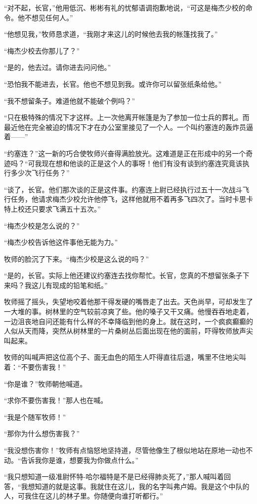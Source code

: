     “对不起，长官，”他用低沉、彬彬有礼的忧郁语调抱歉地说，“可这是梅杰少校的命令。他不想见任何人。”

    “他想见我，”牧师恳求道，“我刚才来这儿的时候他去我的帐篷找我了。”

    “梅杰少校去你那儿了？”

    “是的，他去过。请你进去问问他。”

    “恐怕我不能进去，长官。他也不想见到我。或许你可以留张纸条给他。”

    “我不想留条子。难道他就不能破个例吗？”

    “只在极特殊的情况下才这样。上一次他离开帐篷是为了参加一位士兵的葬礼。而最近他在完全被迫的情况下才在办公室里接见了一个人。一个叫约塞连的轰炸员逼着——”

    “约塞连？”这一新的巧合使牧师兴奋得满脸放光。这难道是正在形成中的另一个奇迹吗？“可我现在想和他谈的正是这个人的事呀！他们有没有谈到约塞连究竟该执行多少次飞行任务？”

    “谈了，长官。他们那次谈的正是这件事。约塞连上尉已经执行过五十一次战斗飞行任务，他请求梅杰少校允许他停飞，这样他就用不着再多飞四次了。当时卡思卡特上校还只要求飞满五十五次。”

    “梅杰少校是怎么说的？”

    “梅杰少校告诉他这件事他无能为力。”

    牧师的脸沉了下来。“梅杰少校是这么说的吗？”

    “是的，长官。实际上他还建议约塞连去找你帮忙。长官，您真的不想留张条子下来吗？我这儿有现成的铅笔和纸。”

    牧师摇了摇头，失望地咬着他那干得发硬的嘴唇走了出去。天色尚早，可却发生了一大堆的事。树林里的空气较前凉爽了些。他的嗓子又干又痛。他慢吞吞地走着，一边沮丧地自问还能有什么样的不幸降临到他的身上。就在这时，一个疯疯癫癫的人似从天而降，突然从树林里的一片桑树丛后面出现在他的面前，吓得牧师放声尖叫起来。

    牧师的叫喊声把这位高个子、面无血色的陌生人吓得直往后退，嘴里不住地尖叫着：“不要伤害我！”

    “你是谁？”牧师朝他喊道。

    “求你不要伤害我！”那人也在喊。

    “我是个随军牧师！”

    “那你为什么想伤害我？”

    “我没想伤害你！”牧师有点恼怒地坚持道，尽管他像生了根似地站在原地一动也不动。“告诉我你是谁，想要我为你做点什么。”

    “我只想知道一级准尉怀特-哈尔福特是不是已经得肺炎死了，”那人喊叫着回答，“我想知道的就是这事。我就住在这儿，我的名字叫弗卢姆。我是这个中队的人，可我住在这儿的林子里。你随便向谁打听都行。”

